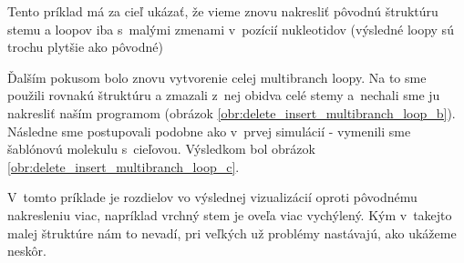 Tento príklad má za cieľ ukázať, že vieme znovu nakresliť pôvodnú štruktúru
stemu a loopov iba s~malými zmenami v~pozícií
nukleotidov (výsledné loopy sú trochu plytšie ako pôvodné)

Ďalším pokusom bolo znovu vytvorenie celej multibranch loopy.
Na to sme použili rovnakú štruktúru a zmazali z~nej obidva celé
stemy a~nechali sme ju nakresliť naším programom
(obrázok \ref{obr:delete_insert_multibranch_loop_b}).
Následne sme postupovali podobne ako v~prvej simulácií - vymenili
sme šablónovú molekulu s~cieľovou. Výsledkom bol obrázok
\ref{obr:delete_insert_multibranch_loop_c}.

V~tomto príklade je rozdielov vo výslednej vizualizácií oproti pôvodnému nakresleniu
viac, napríklad vrchný stem je oveľa viac vychýlený. Kým v~takejto malej štruktúre
nám to nevadí, pri veľkých už problémy nastávajú, ako ukážeme neskôr.

